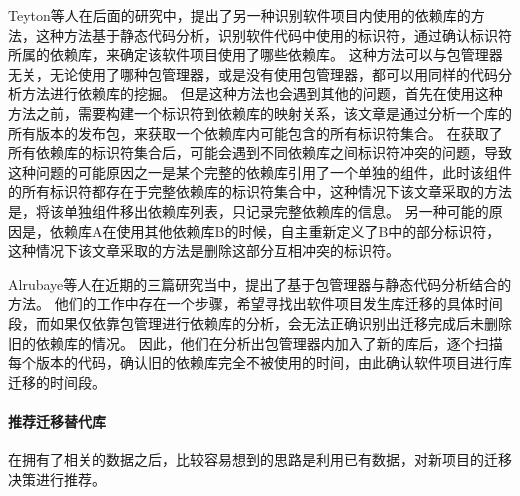 \documentclass[UTF8]{ctexart}
\begin{document}

Teyton等人在后面的研究中\cite{2014JournalOfSysAndSoft-Teyton-Study}，提出了另一种识别软件项目内使用的依赖库的方法，这种方法基于静态代码分析，识别软件代码中使用的标识符，通过确认标识符所属的依赖库，来确定该软件项目使用了哪些依赖库。
这种方法可以与包管理器无关，无论使用了哪种包管理器，或是没有使用包管理器，都可以用同样的代码分析方法进行依赖库的挖掘。
但是这种方法也会遇到其他的问题，首先在使用这种方法之前，需要构建一个标识符到依赖库的映射关系，该文章是通过分析一个库的所有版本的发布包，来获取一个依赖库内可能包含的所有标识符集合。
在获取了所有依赖库的标识符集合后，可能会遇到不同依赖库之间标识符冲突的问题，导致这种问题的可能原因之一是某个完整的依赖库引用了一个单独的组件，此时该组件的所有标识符都存在于完整依赖库的标识符集合中，这种情况下该文章采取的方法是，将该单独组件移出依赖库列表，只记录完整依赖库的信息。
另一种可能的原因是，依赖库A在使用其他依赖库B的时候，自主重新定义了B中的部分标识符，这种情况下该文章采取的方法是删除这部分互相冲突的标识符。


Alrubaye等人在近期的三篇研究当中\cite{2019ICSME-Alrubaye-MigrationMiner,2019ICPC-Alrubaye-On,2018CASCON-Alrubaye-Automating}，提出了基于包管理器与静态代码分析结合的方法。
他们的工作中存在一个步骤，希望寻找出软件项目发生库迁移的具体时间段，而如果仅依靠包管理进行依赖库的分析，会无法正确识别出迁移完成后未删除旧的依赖库的情况。
因此，他们在分析出包管理器内加入了新的库后，逐个扫描每个版本的代码，确认旧的依赖库完全不被使用的时间，由此确认软件项目进行库迁移的时间段。


\paragraph{推荐迁移替代库}
在拥有了相关的数据之后，比较容易想到的思路是利用已有数据，对新项目的迁移决策进行推荐。

\end{document}
